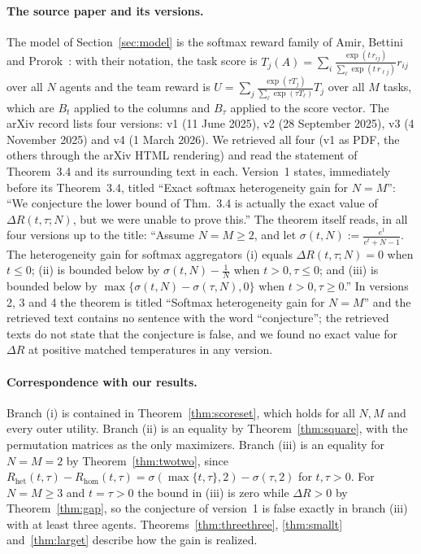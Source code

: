 \documentclass[11pt]{article}
\theoremstyle{plain}
\theoremstyle{definition}
\theoremstyle{remark}
\newcommand{\Rhet}{R_{\mathrm{het}}}
\newcommand{\Rhom}{R_{\mathrm{hom}}}
\newcommand{\sig}{\sigma}
\begin{document}
\paragraph{The source paper and its versions.}
The model of Section~\ref{sec:model} is the softmax reward family of Amir, Bettini and Prorok~\cite{ABPv1,ABPv4}: with their notation, the task score is $T_j(A)=\sum_i\frac{\exp(t\,r_{ij})}{\sum_\ell\exp(t\,r_{\ell j})}r_{ij}$ over all $N$ agents and the team reward is $U=\sum_j\frac{\exp(\tau T_j)}{\sum_\ell\exp(\tau T_\ell)}T_j$ over all $M$ tasks, which are $B_t$ applied to the columns and $B_\tau$ applied to the score vector. The arXiv record lists four versions: v1 (11 June 2025), v2 (28 September 2025), v3 (4 November 2025) and v4 (1 March 2026). We retrieved all four (v1 as PDF, the others through the arXiv HTML rendering) and read the statement of Theorem~3.4 and its surrounding text in each. Version~1 states, immediately before its Theorem~3.4, titled ``Exact softmax heterogeneity gain for $N=M$'': ``We conjecture the lower bound of Thm.\ 3.4 is actually the exact value of $\Delta R(t,\tau;N)$, but we were unable to prove this.'' The theorem itself reads, in all four versions up to the title: ``Assume $N=M\ge2$, and let $\sigma(t,N):=\frac{e^t}{e^t+N-1}$. The heterogeneity gain for softmax aggregators (i) equals $\Delta R(t,\tau;N)=0$ when $t\le0$; (ii) is bounded below by $\sigma(t,N)-\frac1N$ when $t>0,\tau\le0$; and (iii) is bounded below by $\max\{\sigma(t,N)-\sigma(\tau,N),0\}$ when $t>0,\tau\ge0$.'' In versions 2, 3 and 4 the theorem is titled ``Softmax heterogeneity gain for $N=M$'' and the retrieved text contains no sentence with the word ``conjecture''; the retrieved texts do not state that the conjecture is false, and we found no exact value for $\Delta R$ at positive matched temperatures in any version.

\paragraph{Correspondence with our results.}
Branch (i) is contained in Theorem~\ref{thm:scoreset}, which holds for all $N,M$ and every outer utility. Branch (ii) is an equality by Theorem~\ref{thm:square}, with the permutation matrices as the only maximizers. Branch (iii) is an equality for $N=M=2$ by Theorem~\ref{thm:twotwo}, since $\Rhet(t,\tau)-\Rhom(t,\tau)=\sig(\max\{t,\tau\},2)-\sig(\tau,2)$ for $t,\tau>0$. For $N=M\ge3$ and $t=\tau>0$ the bound in (iii) is zero while $\Delta R>0$ by Theorem~\ref{thm:gap}, so the conjecture of version~1 is false exactly in branch (iii) with at least three agents. Theorems~\ref{thm:threethree}, \ref{thm:smallt} and~\ref{thm:larget} describe how the gain is realized.
\end{document}
